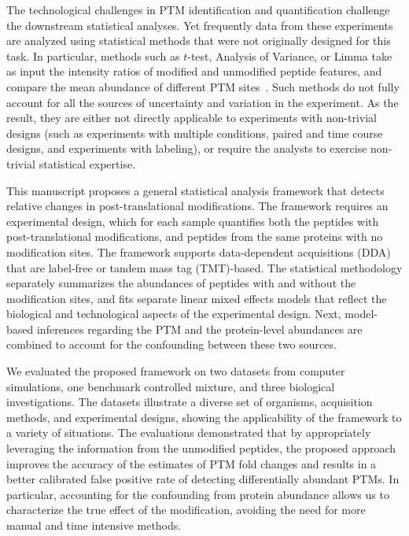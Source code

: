 \documentclass[mcp]{article}
\numberwithin{table}{section}
\begin{document}
The technological challenges in PTM identification and quantification challenge the downstream statistical analyses. Yet frequently data from these experiments are analyzed using statistical methods that were not originally designed for this task. In particular, methods such as $t$-test, Analysis of Variance, or Limma take as input the intensity ratios of modified and unmodified peptide features, and compare the mean abundance of different PTM sites~\cite{Ritchie_15a}. Such methods do not fully account for all the sources of uncertainty and variation in the experiment. As the result, they are either not directly applicable to experiments with non-trivial designs (such as experiments with multiple conditions, paired and time course designs, and experiments with labeling), or require the analysts to exercise non-trivial statistical expertise.

This manuscript proposes a general statistical analysis framework that detects relative changes in post-translational modifications. The framework requires an experimental design, which for each sample quantifies both the peptides with post-translational modifications, and peptides from the same proteins with no modification sites. The framework supports data-dependent acquisitions (DDA) that are label-free or tandem mass tag (TMT)-based. The statistical methodology separately summarizes the abundances of peptides with and without the modification sites, and fits separate linear mixed effects models that reflect the biological and technological aspects of the experimental design. Next, model-based inferences regarding the PTM and the protein-level abundances are combined to account for the confounding between these two sources.

We evaluated the proposed framework on two datasets from computer simulations, one benchmark controlled mixture, and three biological investigations. The datasets illustrate a diverse set of organisms, acquisition methods, and experimental designs, showing the applicability of the framework to a variety of situations. The evaluations demonstrated that by appropriately leveraging the information from the unmodified peptides, the proposed approach improves the accuracy of the estimates of PTM fold changes and results in a better calibrated false positive rate of detecting differentially abundant PTMs. In particular, accounting for the confounding from protein abundance allows us to characterize the true effect of the modification, avoiding the need for more manual and time intensive methods.
\end{document}
